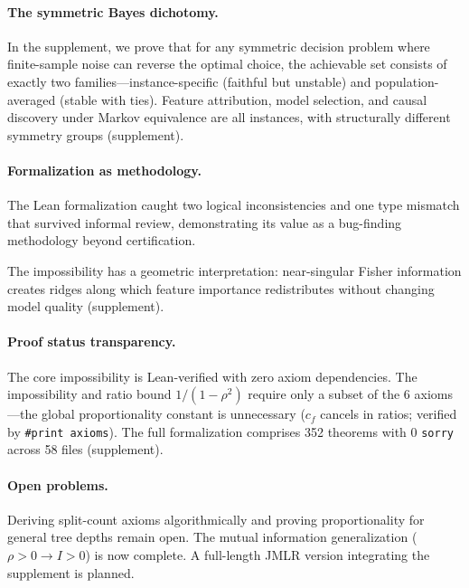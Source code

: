 \documentclass{article}
\begin{document}
\paragraph{The symmetric Bayes dichotomy.}
In the supplement, we prove that for any symmetric decision problem where finite-sample noise can reverse the optimal choice, the achievable set consists of exactly two families---instance-specific (faithful but unstable) and population-averaged (stable with ties).
Feature attribution, model selection, and causal discovery under Markov equivalence are all instances, with structurally different symmetry groups (supplement).

\paragraph{Formalization as methodology.}
The Lean formalization caught two logical inconsistencies and one type mismatch that survived informal review, demonstrating its value as a bug-finding methodology beyond certification.

The impossibility has a geometric interpretation: near-singular Fisher information creates ridges along which feature importance redistributes without changing model quality (supplement).


\paragraph{Proof status transparency.}
The core impossibility is Lean-verified with zero axiom dependencies. The impossibility and ratio bound $1/(1{-}\rho^2)$ require only a subset of the 6 axioms---the global proportionality constant is unnecessary ($c_f$ cancels in ratios; verified by \texttt{\#print axioms}). The full formalization comprises 352 theorems with 0 \texttt{sorry} across 58 files (supplement).

\paragraph{Open problems.}
Deriving split-count axioms algorithmically and proving proportionality for general tree depths remain open. The mutual information generalization ($\rho > 0 \to I > 0$) is now complete.
A full-length JMLR version integrating the supplement is planned.
\end{document}
